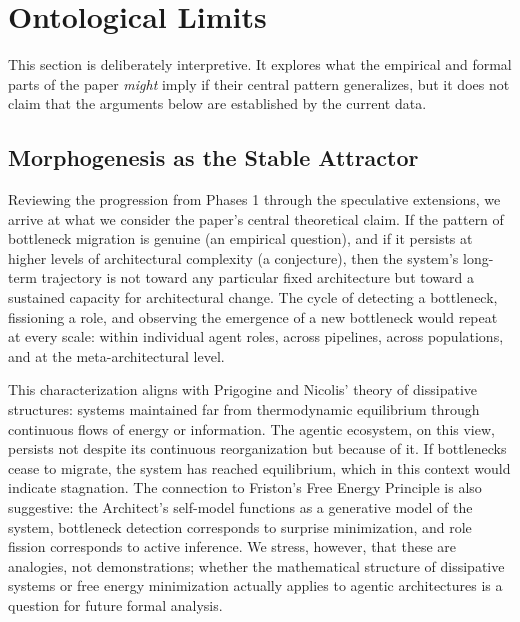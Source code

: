 \section{Ontological Limits}

This section is deliberately interpretive. It explores what the empirical and formal parts of the paper \emph{might} imply if their central pattern generalizes, but it does not claim that the arguments below are established by the current data.

\subsection{Morphogenesis as the Stable Attractor}

Reviewing the progression from Phases 1 through the speculative extensions, we arrive at what we consider the paper's central theoretical claim. If the pattern of bottleneck migration is genuine (an empirical question), and if it persists at higher levels of architectural complexity (a conjecture), then the system's long-term trajectory is not toward any particular fixed architecture but toward a sustained capacity for architectural change. The cycle of detecting a bottleneck, fissioning a role, and observing the emergence of a new bottleneck would repeat at every scale: within individual agent roles, across pipelines, across populations, and at the meta-architectural level.

This characterization aligns with Prigogine and Nicolis' \cite{prigogine1977} theory of dissipative structures: systems maintained far from thermodynamic equilibrium through continuous flows of energy or information. The agentic ecosystem, on this view, persists not despite its continuous reorganization but because of it. If bottlenecks cease to migrate, the system has reached equilibrium, which in this context would indicate stagnation. The connection to Friston's \cite{friston2010} Free Energy Principle is also suggestive: the Architect's self-model functions as a generative model of the system, bottleneck detection corresponds to surprise minimization, and role fission corresponds to active inference. We stress, however, that these are analogies, not demonstrations; whether the mathematical structure of dissipative systems or free energy minimization actually applies to agentic architectures is a question for future formal analysis.


